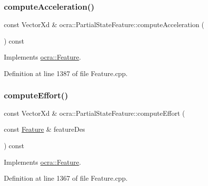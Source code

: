 \subsubsection{\texorpdfstring{compute\+Acceleration()}{computeAcceleration()}\hspace{0.1cm}{\footnotesize\ttfamily [2/2]}}
{\footnotesize\ttfamily const Vector\+Xd \& ocra\+::\+Partial\+State\+Feature\+::compute\+Acceleration (\begin{DoxyParamCaption}{ }\end{DoxyParamCaption}) const\hspace{0.3cm}{\ttfamily [virtual]}}



Implements \hyperlink{classocra_1_1Feature_aa42b61d4255116caa92042d01ca36b79}{ocra\+::\+Feature}.



Definition at line 1387 of file Feature.\+cpp.

\hypertarget{classocra_1_1PartialStateFeature_a96de4c58baceb9430a1845c4db6ecdfc}{}\label{classocra_1_1PartialStateFeature_a96de4c58baceb9430a1845c4db6ecdfc} 
\subsubsection{\texorpdfstring{compute\+Effort()}{computeEffort()}\hspace{0.1cm}{\footnotesize\ttfamily [1/2]}}
{\footnotesize\ttfamily const Vector\+Xd \& ocra\+::\+Partial\+State\+Feature\+::compute\+Effort (\begin{DoxyParamCaption}\item[{const \hyperlink{classocra_1_1Feature}{Feature} \&}]{feature\+Des }\end{DoxyParamCaption}) const\hspace{0.3cm}{\ttfamily [virtual]}}



Implements \hyperlink{classocra_1_1Feature_a19626a241666fdae253af1f7b6f2acd7}{ocra\+::\+Feature}.



Definition at line 1367 of file Feature.\+cpp.

\hypertarget{classocra_1_1PartialStateFeature_abc447a46a7bb1b4480af965119d23214}{}\label{classocra_1_1PartialStateFeature_abc447a46a7bb1b4480af965119d23214} 

